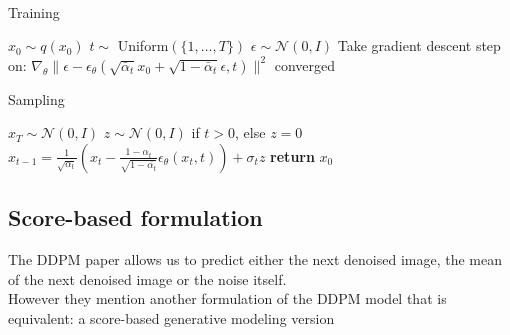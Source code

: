 \documentclass{article}
\begin{document}
\\
\begin{minipage}{0.49\textwidth}
  \begin{algorithm}[H]
    \centering
    \caption{Training}\label{alg:training}
    \begin{algorithmic}[1]
      \Repeat
      \State $x_0 \sim q(x_0)$
      \State $t \sim$ Uniform$(\{1,\ldots, T\})$
      \State $\epsilon \sim \mathcal{N}(0, I)$
      \State Take gradient descent step on:
      \State \quad $\nabla_\theta \| \epsilon - \epsilon_\theta \left( \sqrt{\bar{\alpha}_t} x_0 + \sqrt{1 - \bar{\alpha}_t} \epsilon, t \right) \|^2$
      \Until converged
    \end{algorithmic}
  \end{algorithm}
\end{minipage}
\hfill
\begin{minipage}{0.49\textwidth}
  \begin{algorithm}[H]
    \centering
    \caption{Sampling}\label{alg:sampling}
    \begin{algorithmic}[1]
      \State $x_T \sim \mathcal{N}(0, I)$
        \State $z \sim \mathcal{N}(0, I)$ if $t > 0$, else $z = 0$
        \State $x_{t-1} = \frac{1}{\sqrt{\alpha_t}} \left( x_t - \frac{1 - \alpha_t}{\sqrt{1 - \bar{\alpha_t}}} \epsilon_\theta (x_t, t) \right) + \sigma_t z $
      \EndFor
      \State \textbf{return} $x_0$
    \end{algorithmic}
  \end{algorithm}
\end{minipage}

\subsection{Score-based formulation}
The DDPM paper \cite{ho2020denoising} allows us to predict either the next denoised image, the mean of the next denoised image or the noise itself. \\
However they mention another formulation of the DDPM model that is equivalent: a score-based generative modeling version
\end{document}
